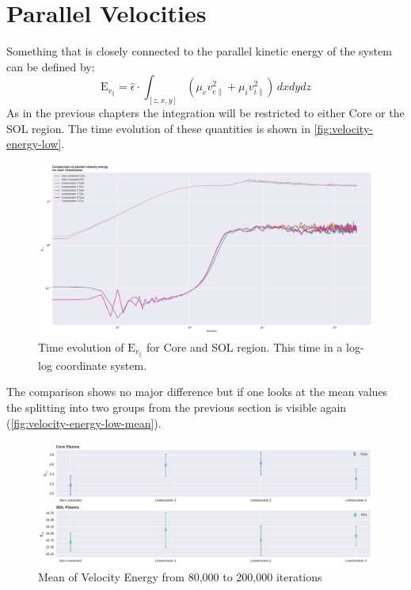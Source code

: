 \documentclass[master.tex]{subfiles}
\begin{document}
\section{Parallel Velocities}\label{sec:polar_parallel_velocities}

Something that is closely connected to the parallel kinetic energy of the system can be defined by:
\begin{equation}
    \mathrm{E}_{v_\parallel} = \hat{\epsilon} \cdot \int_{[z,x,y]} \left( \mu_ev_{e\parallel}^2 + \mu_iv_{i\parallel }^2 \right) \, dxdydz
\end{equation}
As in the previous chapters the integration will be restricted to either Core or the \ac{SOL} region. The time evolution of these quantities is shown in \autoref{fig:velocity-energy-low}.

\begin{figure}[!htbp]
    \includegraphics[width=\linewidth]{pdfs/velocity-energy-low.pdf}
    \caption{Time evolution of $\mathrm{E}_{v_\parallel}$ for Core and \ac{SOL} region. This time in a log-log coordinate system.}
    \label{fig:velocity-energy-low}
\end{figure}

The comparison shows no major difference but if one looks at the mean values the splitting into two groups from the previous section is visible again (\autoref{fig:velocity-energy-low-mean}).


\begin{figure}[!htbp]
    \includegraphics[width=\linewidth]{pdfs/velocity-energy-low-means.pdf}
    \caption{Mean of Velocity Energy from 80,000 to 200,000 iterations}
    \label{fig:velocity-energy-low-mean}
\end{figure}
\end{document}
